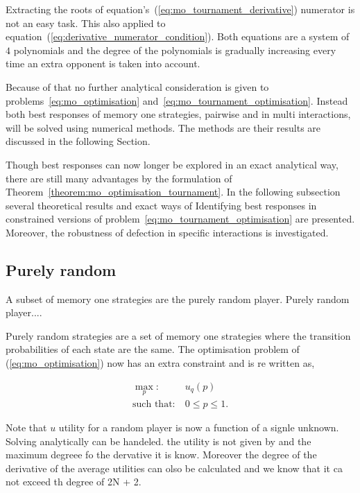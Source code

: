 \documentclass[10pt]{article}
\begin{document}
Extracting the roots of equation's~(\ref{eq:mo_tournament_derivative}) numerator
is not an easy task. This also applied to equation~(\ref{eq:derivative_numerator_condition}).
Both equations are a system of \(4\) polynomials and the degree of the polynomials
is gradually increasing every time an extra opponent is taken into account.

Because of that no further analytical consideration is given to problems~\ref{eq:mo_optimisation}
and~\ref{eq:mo_tournament_optimisation}. Instead both best responses of memory one
strategies, pairwise and in multi interactions, will be solved using numerical
methods. The methods are their results are discussed in the following Section.

Though best responses can now longer be explored in an exact analytical way,
there are still many advantages by the formulation of Theorem~\ref{theorem:mo_optimisation_tournament}.
In the following subsection several theoretical results and exact ways of Identifying
best responses in constrained versions of problem~\ref{eq:mo_tournament_optimisation} are presented.
Moreover, the robustness of defection in specific interactions is investigated.

\subsection{Purely random}

A subset of memory one strategies are the purely random player. Purely random
player....

Purely random strategies are a set of memory one strategies where the transition
probabilities of each state are the same. The optimisation problem of (\ref{eq:mo_optimisation})
now has an extra constraint and is re written as,

\begin{equation}\label{eq:random_optimisation}
\begin{aligned}
\max_p: & \ u_q(p)
\\
\text{such that}: & \ 0 \leq p \leq 1. 
\end{aligned}
\end{equation}

Note that \(u\) utility for a random player is now a function of a signle unknown.
Solving analytically can be handeled. the utility is not given by
and the maximum degreee fo the dervative it is know. Moreover
the degree of the derivative of the average utilities can olso be calculated and we know
that it ca not exceed th degree of 2N + 2. 
\end{document}
